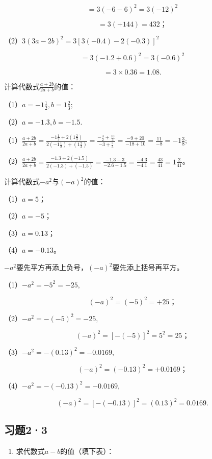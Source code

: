 \[
= 3 (- 6 - 6) ^{2} = 3 (- 12) ^{2}
\]

\[
= 3 (+ 144) = 432\text{；}
\]

（2）\(3(3a - 2b)^{2} = 3[3(-0.4) - 2(-0.3)]^{2}\)

\[
= 3 (- 1.2 + 0.6) ^{2} = 3 (- 0.6) ^{2}
\]

\[
= 3 \times 0.36 = 1.08.
\]

 计算代数式\(\frac{a + 2b}{2a + b}\)的值：

（1）\(a = -1\frac{1}{2}, b = 1\frac{2}{3};\)

（2）\(a = -1.3, b = -1.5.\)

（1）\(\frac{a + 2b}{2a + b} = \frac{-1\frac{1}{2} + 2\left(1\frac{2}{3}\right)}{2\left(-1\frac{1}{2}\right) + \left(1\frac{2}{3}\right)} = \frac{-\frac{3}{2} + \frac{10}{3}}{-3 + \frac{5}{3}}\)\(= \frac{-9 + 20}{-18 + 10} = \frac{11}{-8} = -1\frac{3}{8};\)

（2）\(\frac{a + 2b}{2a + b} = \frac{-1.3 + 2(-1.5)}{2(-1.3) + (-1.5)} = \frac{-1.3 - 3}{-2.6 - 1.5}\)\(= \frac{-4.3}{-4.1} = \frac{43}{41} = 1\frac{2}{41}\)。

 计算代数式\(-a^2\)与\((-a)^2\)的值：

（1）\(a = 5\)；

（2）\(a = -5\)；

（3）\(a = 0.13\)；

（4）\(a = -0.13\)。

\(-a^2\)要先平方再添上负号，\((-a)^2\)要先添上括号再平方。

 （1）\(-a^{2} = -5^{2} = -25,\)

\[
(- a) ^{2} = (- 5) ^{2} = + 25\text{；}
\]

（2）\(-a^{2} = -(-5)^{2} = -25,\)

\[
(- a) ^{2} = [ - (- 5) ] ^{2} = 5 ^{2} = 25\text{；}
\]

（3）\(-a^{2} = -(0.13)^{2} = -0.0169,\)

\[
(- a) ^{2} = (- 0.13) ^{2} = + 0.0169\text{；}
\]

（4）\(-a^{2} = -(-0.13)^{2} = -0.0169,\)

\[
(- a) ^{2} = [ - (- 0.13) ] ^{2} = (0.13) ^{2} = 0.0169.
\]

\subsection{习题2·3}

\begin{enumerate}
\item
  求代数式\(a - b\)的值（填下表）：
\end{enumerate}


